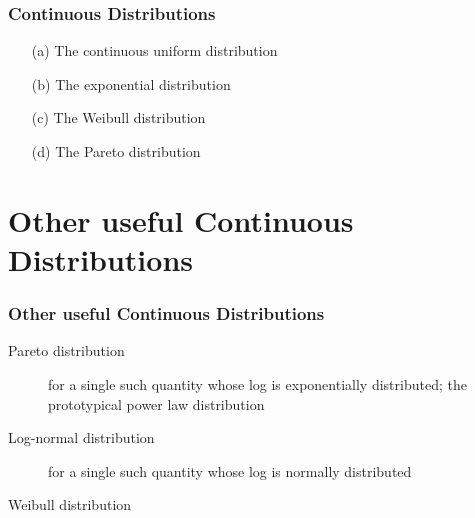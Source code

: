 \documentclass[11pt]{beamer} %
\begin{document}
\begin{frame}
\frametitle{ Continuous Distributions}
\begin{itemize}
\item[(a)] The continuous uniform distribution
\item[(b)] The exponential distribution
\item[(c)] The Weibull distribution
\item[(d)] The Pareto distribution
\end{itemize}
\end{frame}




\section{Other useful Continuous Distributions}

\begin{frame}
\frametitle{Other useful Continuous Distributions}
\begin{description}
\item [Pareto distribution] for a single such quantity whose log is exponentially distributed; 
the prototypical power law distribution
\item [Log-normal distribution] for a single such quantity whose log is normally distributed
\item [Weibull distribution]
\end{description}
\end{frame}
\end{document}
